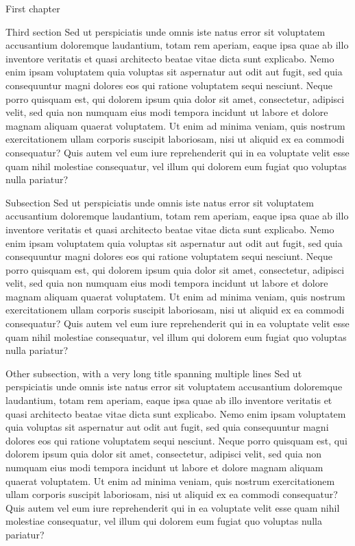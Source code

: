 \documentclass[french, english]{mythesis}
\begin{document}
\begin{mychapter}{First chapter}
	\begin{mysection}{Third section}
Sed ut perspiciatis unde omnis iste natus error sit voluptatem accusantium doloremque laudantium, totam rem aperiam, eaque ipsa quae ab illo inventore veritatis et quasi architecto beatae vitae dicta sunt explicabo. Nemo enim ipsam voluptatem quia voluptas sit aspernatur aut odit aut fugit, sed quia consequuntur magni dolores eos qui ratione voluptatem sequi nesciunt. Neque porro quisquam est, qui dolorem ipsum quia dolor sit amet, consectetur, adipisci velit, sed quia non numquam eius modi tempora incidunt ut labore et dolore magnam aliquam quaerat voluptatem. Ut enim ad minima veniam, quis nostrum exercitationem ullam corporis suscipit laboriosam, nisi ut aliquid ex ea commodi consequatur? Quis autem vel eum iure reprehenderit qui in ea voluptate velit esse quam nihil molestiae consequatur, vel illum qui dolorem eum fugiat quo voluptas nulla pariatur?
	\begin{mysubsection}{Subsection}
	Sed ut perspiciatis unde omnis iste natus error sit voluptatem accusantium doloremque laudantium, totam rem aperiam, eaque ipsa quae ab illo inventore veritatis et quasi architecto beatae vitae dicta sunt explicabo. Nemo enim ipsam voluptatem quia voluptas sit aspernatur aut odit aut fugit, sed quia consequuntur magni dolores eos qui ratione voluptatem sequi nesciunt. Neque porro quisquam est, qui dolorem ipsum quia dolor sit amet, consectetur, adipisci velit, sed quia non numquam eius modi tempora incidunt ut labore et dolore magnam aliquam quaerat voluptatem. Ut enim ad minima veniam, quis nostrum exercitationem ullam corporis suscipit laboriosam, nisi ut aliquid ex ea commodi consequatur? Quis autem vel eum iure reprehenderit qui in ea voluptate velit esse quam nihil molestiae consequatur, vel illum qui dolorem eum fugiat quo voluptas nulla pariatur?
	\end{mysubsection}
	\begin{mysubsection}{Other subsection, with a very long title spanning multiple lines}
	Sed ut perspiciatis unde omnis iste natus error sit voluptatem accusantium doloremque laudantium, totam rem aperiam, eaque ipsa quae ab illo inventore veritatis et quasi architecto beatae vitae dicta sunt explicabo. Nemo enim ipsam voluptatem quia voluptas sit aspernatur aut odit aut fugit, sed quia consequuntur magni dolores eos qui ratione voluptatem sequi nesciunt. Neque porro quisquam est, qui dolorem ipsum quia dolor sit amet, consectetur, adipisci velit, sed quia non numquam eius modi tempora incidunt ut labore et dolore magnam aliquam quaerat voluptatem. Ut enim ad minima veniam, quis nostrum exercitationem ullam corporis suscipit laboriosam, nisi ut aliquid ex ea commodi consequatur? Quis autem vel eum iure reprehenderit qui in ea voluptate velit esse quam nihil molestiae consequatur, vel illum qui dolorem eum fugiat quo voluptas nulla pariatur?
	\end{mysubsection}
	\end{mysection}
	\end{mychapter}
\end{document}

